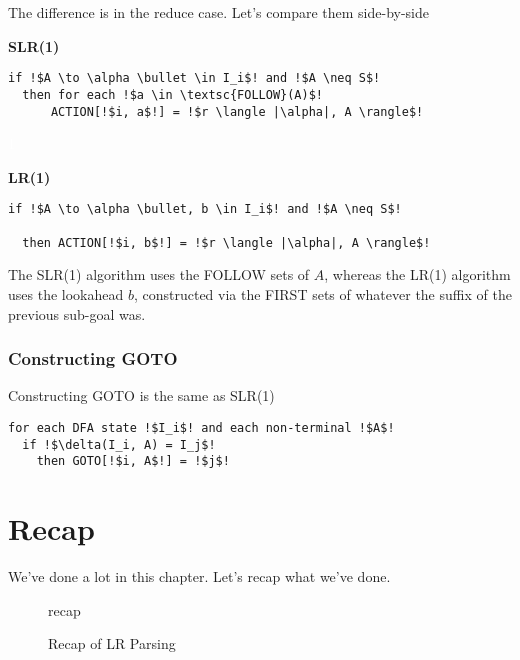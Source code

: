 The difference is in the reduce case. Let's compare them side-by-side

\begin{minipage}[t]{0.49\textwidth}
\textbf{SLR(1)}
\begin{lstlisting}[style=pseudocode]
if !$A \to \alpha \bullet \in I_i$! and !$A \neq S$! 
  then for each !$a \in \textsc{FOLLOW}(A)$!
      ACTION[!$i, a$!] = !$r \langle |\alpha|, A \rangle$!
\end{lstlisting}
\end{minipage}%
\begin{minipage}[t]{0.02\textwidth}
\textcolor{white}{1}
\end{minipage}%
\begin{minipage}[t]{0.49\textwidth}
\textbf{LR(1)}
 \begin{lstlisting}[style=pseudocode]
if !$A \to \alpha \bullet, b \in I_i$! and !$A \neq S$! 
  
  then ACTION[!$i, b$!] = !$r \langle |\alpha|, A \rangle$!
\end{lstlisting}
\end{minipage}

The SLR(1) algorithm uses the FOLLOW sets of $A$, whereas the LR(1) algorithm uses the lookahead $b$, constructed via the FIRST sets of whatever the suffix of the previous sub-goal was.

\subsubsection{Constructing GOTO}
Constructing GOTO is the same as SLR(1)

\begin{code}
\begin{lstlisting}[style=pseudocode]
for each DFA state !$I_i$! and each non-terminal !$A$!
  if !$\delta(I_i, A) = I_j$! 
    then GOTO[!$i, A$!] = !$j$!
\end{lstlisting}
\vspace{1mm}
\end{code}

\section{Recap}
We've done a lot in this chapter. Let's recap what we've done. 

\begin{figure}[H]
    \centering
    {recap}
    \caption{Recap of LR Parsing}
    \label{fig:lr-parsing-recap}
\end{figure}

